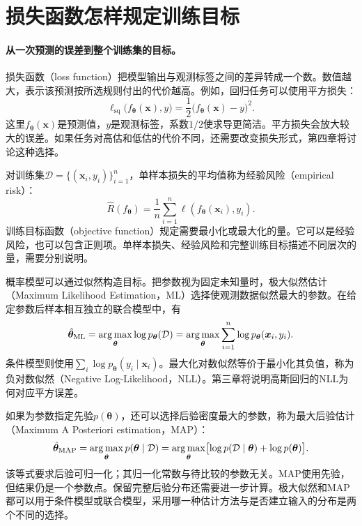\section{损失函数怎样规定训练目标}

\paragraph{从一次预测的误差到整个训练集的目标。}
损失函数（loss function）把模型输出与观测标签之间的差异转成一个数。数值越大，表示该预测按所选规则付出的代价越高。例如，回归任务可以使用平方损失：
\begin{equation}
 \ell_{\mathrm{sq}}\bigl(f_{\bm{\theta}}(\bm{x}),y\bigr)=\frac12\bigl(f_{\bm{\theta}}(\bm{x})-y\bigr)^2.
\end{equation}
这里$f_{\bm\theta}(\bm x)$是预测值，$y$是观测标签，系数$1/2$使求导更简洁。平方损失会放大较大的误差。如果任务对高估和低估的代价不同，还需要改变损失形式，第四章将讨论这种选择。

对训练集$\mathcal D=\{(\bm x_i,y_i)\}_{i=1}^n$，单样本损失的平均值称为经验风险（empirical risk）：
\begin{equation}
 \hat R(f_{\bm\theta})=\frac1n\sum_{i=1}^n\ell(f_{\bm\theta}(\bm x_i),y_i).
\end{equation}
训练目标函数（objective function）规定需要最小化或最大化的量。它可以是经验风险，也可以包含正则项。单样本损失、经验风险和完整训练目标描述不同层次的量，需要分别说明。

概率模型可以通过似然构造目标。把参数视为固定未知量时，极大似然估计（Maximum Likelihood Estimation，ML）选择使观测数据似然最大的参数。在给定参数后样本相互独立的联合模型中，有
\begin{equation}
 \hat{\bm{\theta}}_{\mathrm{ML}}
 =\mathop{\mathrm{arg\,max}}_{\bm{\theta}}\log p_{\bm{\theta}}(\mathcal D)
 =\mathop{\mathrm{arg\,max}}_{\bm{\theta}}\sum_{i=1}^{n}\log p_{\bm{\theta}}(\bm{x}_i,y_i).
\end{equation}
条件模型则使用$\sum_i\log p_{\bm\theta}(y_i\mid\bm x_i)$。最大化对数似然等价于最小化其负值，称为负对数似然（Negative Log-Likelihood，NLL）。第三章将说明高斯回归的NLL为何对应平方误差。

如果为参数指定先验$p(\bm\theta)$，还可以选择后验密度最大的参数，称为最大后验估计（Maximum A Posteriori estimation，MAP）：
\begin{equation}
 \hat{\bm{\theta}}_{\mathrm{MAP}}
 =\mathop{\mathrm{arg\,max}}_{\bm{\theta}}p(\bm{\theta}\mid\mathcal D)
 =\mathop{\mathrm{arg\,max}}_{\bm{\theta}}\bigl[\log p(\mathcal D\mid\bm{\theta})+\log p(\bm{\theta})\bigr].
\end{equation}
该等式要求后验可归一化；其归一化常数与待比较的参数无关。MAP使用先验，但结果仍是一个参数点。保留完整后验分布还需要进一步计算。极大似然和MAP都可以用于条件模型或联合模型，采用哪一种估计方法与是否建立输入的分布是两个不同的选择。


